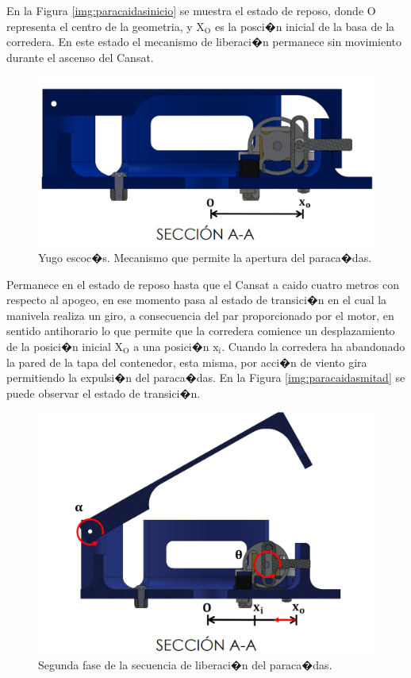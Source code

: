 \documentclass[10pt,a4paper]{book}
\begin{document}
En la Figura \ref{img:paracaidasinicio} se muestra el estado de reposo, donde O representa el centro de la geometria, y $\text{X}_{\text{O}}$ es la posci�n inicial de la basa de la corredera. En este estado el mecanismo de liberaci�n permanece sin movimiento durante el ascenso del Cansat.

\begin{figure}[H]
\begin{center}
\includegraphics[scale=0.25]{Imagenes/Paracaidasinicio.png}
\caption{Yugo escoc�s. Mecanismo que permite la apertura del paraca�das. \label{img:Paracaidasinicio}}
\end{center}
\end{figure} 

 Permanece en el estado de reposo hasta que el Cansat a caido cuatro metros con respecto al apogeo, en ese momento pasa al estado de transici�n en el cual la manivela realiza un giro, a consecuencia del par proporcionado por el motor, en sentido antihorario lo que permite que la corredera comience un desplazamiento de la posici�n inicial $\text{X}_{\text{O}}$ a una posici�n $\text{x}_{\text{i}}$. Cuando la corredera ha abandonado la pared de la tapa del contenedor, esta misma, por acci�n de viento gira permitiendo la expulsi�n del paraca�das. En la Figura \ref{img:paracaidasmitad} se puede observar el estado de transici�n.

\begin{figure}[H]
\begin{center}
\includegraphics[scale=0.30]{Imagenes/Paracaidasmitad.png}
\caption{Segunda fase de la secuencia de liberaci�n del paraca�das. \label{img:Paracaidasinicio}}
\end{center}
\end{figure} 
\end{document}
